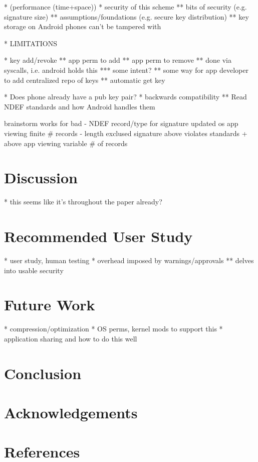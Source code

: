 \documentclass[12pt]{article}
\begin{document}
* (performance (time+space))
* security of this scheme
** bits of security (e.g. signature size)
** assumptions/foundations (e.g. secure key distribution)
** key storage on Android phones can't be tampered with

* LIMITATIONS

* key add/revoke
** app perm to add
** app perm to remove
** done via syscalls, i.e. android holds this
*** some intent?
** some way for app developer to add centralized repo of keys
** automatic get key

* Does phone already have a pub key pair?
* backwards compatibility
** Read NDEF standards and how Android handles them

brainstorm                         works for                           bad
- NDEF record/type for signature   updated os
                                   app viewing finite \# records
- length exclused signature        above                               violates standards
  + above                          app viewing variable \# of records   


\section{Discussion}
* this seems like it's throughout the paper already?

\section{Recommended User Study}
* user study, human testing
* overhead imposed by warnings/approvals
** delves into usable security

\section{Future Work}
* compression/optimization
* OS perms, kernel mods to support this
* application sharing and how to do this well

\section{Conclusion}

\section{Acknowledgements}

\section{References}



\end{document}
